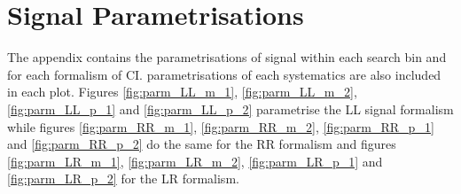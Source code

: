 \chapter{Signal Parametrisations}
	\label{ap:parm}

The appendix contains the parametrisations of signal within each search bin and for each formalism of CI. parametrisations of each systematics are also included in each plot. Figures \ref{fig:parm_LL_m_1}, \ref{fig:parm_LL_m_2}, \ref{fig:parm_LL_p_1} and \ref{fig:parm_LL_p_2} parametrise the LL signal formalism while figures \ref{fig:parm_RR_m_1}, \ref{fig:parm_RR_m_2}, \ref{fig:parm_RR_p_1} and \ref{fig:parm_RR_p_2} do the same for the RR formalism and figures \ref{fig:parm_LR_m_1}, \ref{fig:parm_LR_m_2}, \ref{fig:parm_LR_p_1} and \ref{fig:parm_LR_p_2} for the LR formalism.




